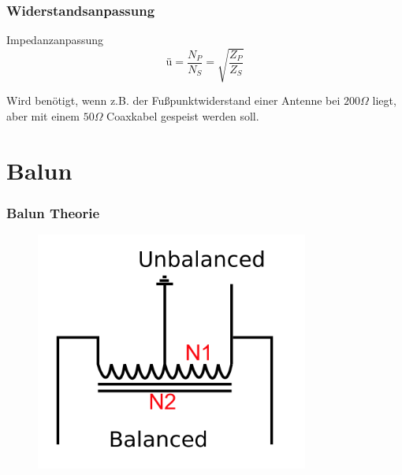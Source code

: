 \begin{frame}
  \frametitle{Widerstandsanpassung}
  \begin{block}{Impedanzanpassung}
    $$\text{\"u} = \frac{N_P}{N_S} = \sqrt{\frac{Z_P}{Z_S}}$$
  \end{block}
  \vspace{2em}
  Wird benötigt, wenn z.B. der Fußpunktwiderstand einer Antenne bei $200\Omega$ liegt, aber mit einem $50\Omega$ Coaxkabel gespeist werden soll.
\end{frame}

\section*{Balun}

\begin{frame}
  \frametitle{Balun Theorie}
  \begin{center}
    \begin{figure}
      \includegraphics[width=0.8\textwidth,height=.75\textheight,keepaspectratio]{a03/Cdbalun2.png}
    \end{figure}
  \end{center}
\end{frame}

